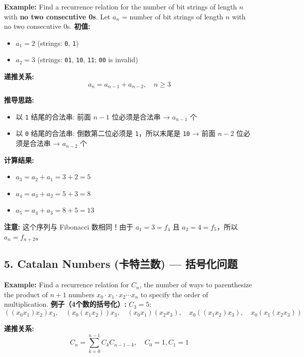 \documentclass[10pt,a4paper,openany]{ctexbook}
\theoremstyle{definition}
\theoremstyle{remark}
\begin{document}
\textbf{Example:} Find a recurrence relation for the number of bit strings of length $n$ with \textbf{no two consecutive 0s}.
Let $a_n$ = number of bit strings of length $n$ with no two consecutive 0s.
\textbf{初值:}
\begin{itemize}
\item $a_1 = 2$ (strings: \texttt{0}, \texttt{1})
\item $a_2 = 3$ (strings: \texttt{01}, \texttt{10}, \texttt{11}; \texttt{00} is invalid)

\end{itemize}

\textbf{递推关系:}
\[
a_n = a_{n-1} + a_{n-2}, \quad n \ge 3
\]

\textbf{推导思路:}
\begin{itemize}
\item 以 \texttt{1} 结尾的合法串: 前面 $n-1$ 位必须是合法串 → $a_{n-1}$ 个
\item 以 \texttt{0} 结尾的合法串: 倒数第二位必须是 \texttt{1}，所以末尾是 \texttt{10} → 前面 $n-2$ 位必须是合法串 → $a_{n-2}$ 个

\end{itemize}

\textbf{计算结果:}
\begin{itemize}
\item $a_3 = a_2 + a_1 = 3 + 2 = 5$
\item $a_4 = a_3 + a_2 = 5 + 3 = 8$
\item $a_5 = a_4 + a_3 = 8 + 5 = 13$

\end{itemize}

\textbf{注意:} 这个序列与 Fibonacci 数相同！由于 $a_1 = 3 = f_4$ 且 $a_2 = 4 = f_5$，所以 $a_n = f_{n+2}$。
\vspace{-2pt}

\subsection{5. Catalan Numbers (卡特兰数) — 括号化问题}

\textbf{Example:} Find a recurrence relation for $C_n$, the number of ways to parenthesize the product of $n+1$ numbers $x_0 \cdot x_1 \cdot x_2 \cdots x_n$ to specify the order of multiplication.
\textbf{例子（4个数的括号化）:}
$C_3 = 5$:
\[
((x_0 x_1) x_2) x_3, \quad (x_0 (x_1 x_2)) x_3, \quad (x_0 x_1)(x_2 x_3), \quad x_0 ((x_1 x_2)x_3), \quad x_0 (x_1 (x_2 x_3))
\]

\textbf{递推关系:}
\[
C_n = \sum_{k=0}^{n-1} C_k C_{n-1-k}, \quad C_0 = 1, C_1 = 1
\]
\end{document}
